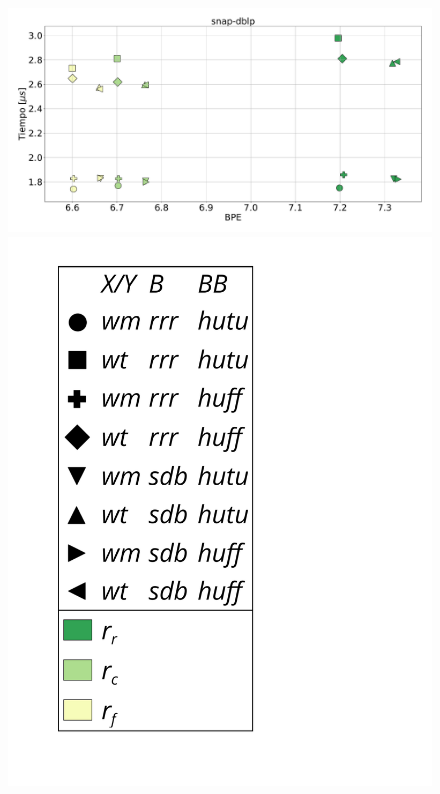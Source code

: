 \begin{figure}
    	\centering
    	\begin{minipage}{1\textwidth}
    			\centering
    			\begin{minipage}{0.8\textwidth}
    				\centering
    				\includegraphics[width=1\linewidth]{img/sdsl/secuencialBig/snap-dblp.pdf}
    			\end{minipage}
    			\begin{minipage}{0.15\textwidth}
    				\centering
    				\includegraphics[scale=.235, clip, trim=70 0 0 0]{img/sdsl/label.pdf}
    			\end{minipage}
    			

\end{minipage}
\end{figure}
